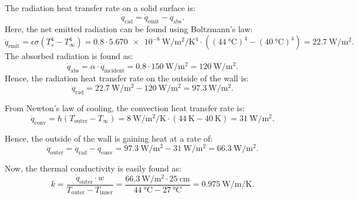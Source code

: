 \begin{derivation}
  The radiation heat transfer rate on a solid surface is:
  \begin{equation*}
    \dot{q}_{\text{rad}} = \dot{q}_{\text{emit}} - \dot{q}_{\text{abs}}
  .\end{equation*}
  Here, the net emitted radiation can be found using Boltzmann's law:
  \begin{equation*}
    \dot{q}_{\text{emit}} = \epsilon \sigma \left( T_{s}^{4} - T_{\infty}^{4} \right) = \num{0,8} \cdot \qty{5,670e-8}{\W\per\m\squared\per\K\tothe{4}} \cdot \left( \left( \qty{44}{\celsius} \right)^4 - \left( \qty{40}{\celsius}  \right)^4 \right) = \qty{22,7}{\W\per\m\squared} 
  .\end{equation*}
  The absorbed radiation is found as:
  \begin{equation*}
    \dot{q}_{\text{abs}} = \alpha \cdot \dot{q}_{\text{incident}} = \num{0,8} \cdot \qty{150}{\W\per\m\squared}  = \qty{120}{\W\per\m\squared} 
  .\end{equation*}
  Hence, the radiation heat transfer rate on the outside of the wall is:
  \begin{equation*}
    \dot{q}_{\text{rad}} = \qty{22,7}{\W\per\m\squared} - \qty{120}{\W\per\m\squared} = \qty{97,3}{\W\per\m\squared} 
  .\end{equation*}
  
  From Newton's law of cooling, the convection heat transfer rate is:
  \begin{equation*}
    \dot{q}_{\text{conv}} = h \left( T_{\text{outer}} - T_{\infty} \right) = \qty{8}{\W\per\m\squared\per\K}  \cdot \left( \qty{44}{\K} - \qty{40}{\K}  \right)  = \qty{31}{\W\per\m\squared} 
  .\end{equation*}
  
  Hence, the outside of the wall is gaining heat at a rate of:
  \begin{equation*}
    \dot{q}_{\text{outer}} = \dot{q}_{\text{rad}} - \dot{q}_{\text{conv}} = \qty{97,3}{\W\per\m\squared} - \qty{31}{\W\per\m\squared}  = \qty{66,3}{\W\per\m\squared} 
  .\end{equation*}
  
  Now, the thermal conductivity is easily found as:
  \begin{equation*}
    k = \frac{\dot{q}_{\text{outer}} \cdot w}{ T_{\text{outer}} - T_{\text{inner}}} = \frac{\qty{66,3}{\W\per\m\squared} \cdot \qty{25}{\cm} }{\qty{44}{\celsius} -\qty{27}{\celsius} } = \qty{0,975}{\W\per\m\per\K}
  .\end{equation*}
\end{derivation}

